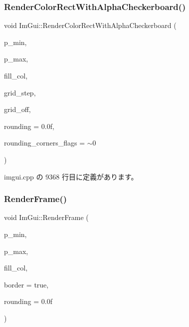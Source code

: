 \subsubsection{\texorpdfstring{Render\+Color\+Rect\+With\+Alpha\+Checkerboard()}{RenderColorRectWithAlphaCheckerboard()}}
{\footnotesize\ttfamily void Im\+Gui\+::\+Render\+Color\+Rect\+With\+Alpha\+Checkerboard (\begin{DoxyParamCaption}\item[{\mbox{\hyperlink{struct_im_vec2}{Im\+Vec2}}}]{p\+\_\+min,  }\item[{\mbox{\hyperlink{struct_im_vec2}{Im\+Vec2}}}]{p\+\_\+max,  }\item[{\mbox{\hyperlink{imgui_8h_a118cff4eeb8d00e7d07ce3d6460eed36}{Im\+U32}}}]{fill\+\_\+col,  }\item[{float}]{grid\+\_\+step,  }\item[{\mbox{\hyperlink{struct_im_vec2}{Im\+Vec2}}}]{grid\+\_\+off,  }\item[{float}]{rounding = {\ttfamily 0.0f},  }\item[{int}]{rounding\+\_\+corners\+\_\+flags = {\ttfamily $\sim$0} }\end{DoxyParamCaption})}



 imgui.\+cpp の 9368 行目に定義があります。

\mbox{\label{namespace_im_gui_a621ba649568ede3939d4f10d83b86d04}} 
\subsubsection{\texorpdfstring{Render\+Frame()}{RenderFrame()}}
{\footnotesize\ttfamily void Im\+Gui\+::\+Render\+Frame (\begin{DoxyParamCaption}\item[{\mbox{\hyperlink{struct_im_vec2}{Im\+Vec2}}}]{p\+\_\+min,  }\item[{\mbox{\hyperlink{struct_im_vec2}{Im\+Vec2}}}]{p\+\_\+max,  }\item[{\mbox{\hyperlink{imgui_8h_a118cff4eeb8d00e7d07ce3d6460eed36}{Im\+U32}}}]{fill\+\_\+col,  }\item[{bool}]{border = {\ttfamily true},  }\item[{float}]{rounding = {\ttfamily 0.0f} }\end{DoxyParamCaption})}



